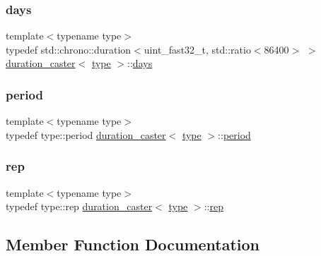 \subsubsection{\texorpdfstring{days}{days}}
{\footnotesize\ttfamily template$<$typename type$>$ \\
typedef std\+::chrono\+::duration$<$uint\+\_\+fast32\+\_\+t, std\+::ratio$<$86400$>$ $>$ \mbox{\hyperlink{classduration__caster}{duration\+\_\+caster}}$<$ \mbox{\hyperlink{_s_d_l__opengl_8h_ad5ddf6fca7b585646515660e810e0188}{type}} $>$\+::\mbox{\hyperlink{classduration__caster_a04fee4c68761f22d238c731c4a89e150}{days}}}

\mbox{\label{classduration__caster_ac22f4732d7e0b975d5c5d2e82a7635c4}} 
\subsubsection{\texorpdfstring{period}{period}}
{\footnotesize\ttfamily template$<$typename type$>$ \\
typedef type\+::period \mbox{\hyperlink{classduration__caster}{duration\+\_\+caster}}$<$ \mbox{\hyperlink{_s_d_l__opengl_8h_ad5ddf6fca7b585646515660e810e0188}{type}} $>$\+::\mbox{\hyperlink{classduration__caster_ac22f4732d7e0b975d5c5d2e82a7635c4}{period}}}

\mbox{\label{classduration__caster_aa56a3f1e4b4c1651fbe0b52f9575e1bd}} 
\subsubsection{\texorpdfstring{rep}{rep}}
{\footnotesize\ttfamily template$<$typename type$>$ \\
typedef type\+::rep \mbox{\hyperlink{classduration__caster}{duration\+\_\+caster}}$<$ \mbox{\hyperlink{_s_d_l__opengl_8h_ad5ddf6fca7b585646515660e810e0188}{type}} $>$\+::\mbox{\hyperlink{classduration__caster_aa56a3f1e4b4c1651fbe0b52f9575e1bd}{rep}}}



\subsection{Member Function Documentation}
\mbox{\label{classduration__caster_a84c3172d12565e8d1921801f1cc5a698}} 
